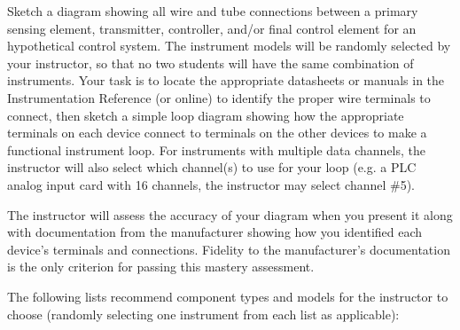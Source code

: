 

Sketch a diagram showing all wire and tube connections between a primary sensing element, transmitter, controller, and/or final control element for an hypothetical control system.  The instrument models will be randomly selected by your instructor, so that no two students will have the same combination of instruments.  Your task is to locate the appropriate datasheets or manuals in the Instrumentation Reference (or online) to identify the proper wire terminals to connect, then sketch a simple loop diagram showing how the appropriate terminals on each device connect to terminals on the other devices to make a functional instrument loop.  For instruments with multiple data channels, the instructor will also select which channel(s) to use for your loop (e.g. a PLC analog input card with 16 channels, the instructor may select channel \#5).

\vskip 10pt

The instructor will assess the accuracy of your diagram when you present it along with documentation from the manufacturer showing how you identified each device's terminals and connections.  Fidelity to the manufacturer's documentation is the only criterion for passing this mastery assessment.

\vskip 10pt

The following lists recommend component types and models for the instructor to choose (randomly selecting one instrument from each list as applicable):



